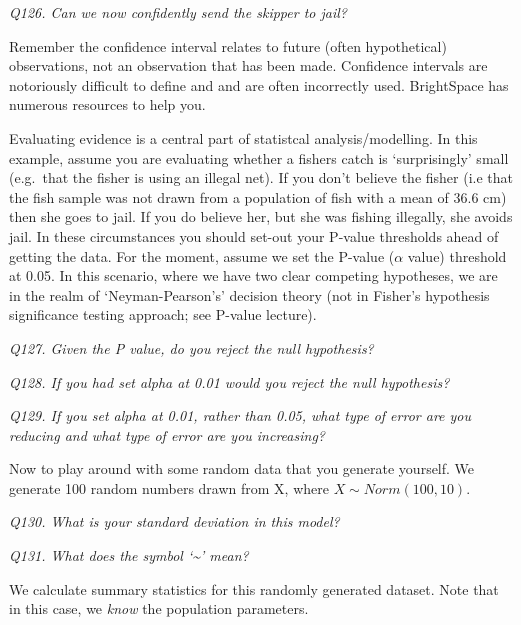 \documentclass[
  11pt,
  a4paper,
]{book}
\begin{document}
\emph{Q126. Can we now confidently send the skipper to jail?}

Remember the confidence interval relates to future (often hypothetical) observations, not an observation that has been made. Confidence intervals are notoriously difficult to define and and are often incorrectly used. BrightSpace has numerous resources to help you.

Evaluating evidence is a central part of statistcal analysis/modelling. In this example, assume you are evaluating whether a fishers catch is `surprisingly' small (e.g.~that the fisher is using an illegal net). If you don't believe the fisher (i.e that the fish sample was not drawn from a population of fish with a mean of 36.6 cm) then she goes to jail. If you do believe her, but she was fishing illegally, she avoids jail. In these circumstances you should set-out your P-value thresholds ahead of getting the data. For the moment, assume we set the P-value (\(\alpha\) value) threshold at 0.05. In this scenario, where we have two clear competing hypotheses, we are in the realm of `Neyman-Pearson's' decision theory (not in Fisher's hypothesis significance testing approach; see P-value lecture).

\emph{Q127. Given the P value, do you reject the null hypothesis?}

\emph{Q128. If you had set alpha at 0.01 would you reject the null hypothesis?}

\emph{Q129. If you set alpha at 0.01, rather than 0.05, what type of error are you reducing and what type of error are you increasing?}

Now to play around with some random data that you generate yourself. We generate 100 random numbers drawn from X, where \(X \sim Norm(100, 10)\).

\emph{Q130. What is your standard deviation in this model?}

\emph{Q131. What does the symbol `\textasciitilde{}' mean?}

We calculate summary statistics for this randomly generated dataset. Note that in this case, we \emph{know} the population parameters.
\end{document}
